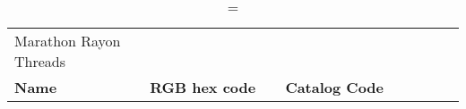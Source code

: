 
\begin{longtable}{p{0.3\linewidth} p{0.3\linewidth} p{0.4\linewidth}}
\caption = {Marathon Rayon Threads}
\label{tblr:marathonrayon}\\
\textbf{Name} & \textbf{RGB hex code} & \textbf{Catalog Code} \\

\end{longtable}
